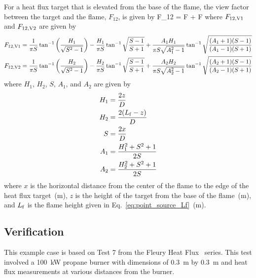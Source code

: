 \noindent For a heat flux target that is elevated from the base of the flame, the view factor between the target and the flame, $F_{12}$, is given by
\be
F_{12} = F + F
\label{eq:solid_flame_F12_V1V2}
\ee
where $F\sb{12, V1}$ and $F\sb{12, V2}$ are given by
\begin{align}
F\sb{12, V1} &= \frac{1}{\pi S} \tan^{-1} \left( \frac{H_1}{\sqrt{S^2-1}} \right) - \frac{H_1}{\pi S} \tan^{-1} \sqrt{\frac{S-1}{S+1}} +
\frac{A_1 H_1}{\pi S \sqrt{A_1^2-1}} \tan^{-1} \sqrt{\frac{(A_1+1)(S-1)}{(A_1-1)(S+1)}} \\
F\sb{12, V2} &= \frac{1}{\pi S} \tan^{-1} \left( \frac{H_2}{\sqrt{S^2-1}} \right) - \frac{H_2}{\pi S} \tan^{-1} \sqrt{\frac{S-1}{S+1}} +
\frac{A_2 H_2}{\pi S \sqrt{A_2^2-1}} \tan^{-1} \sqrt{\frac{(A_2+1)(S-1)}{(A_2-1)(S+1)}}
\label{eq:solid_flame_F12_V1_V2}
\end{align}
where $H_1$, $H_2$, $S$, $A_1$, and $A_2$ are given by
\begin{align}
H_1 &= \frac{2 z}{D}                \\
H_2 &= \frac{2 (L\sb{f}-z)}{D}      \\
S   &= \frac{2 x}{D}                \\
A_1 &= \frac{H_1^2 + S^2 + 1}{2 S}  \\
A_2 &= \frac{H_2^2 + S^2 + 1}{2 S}
\label{eq:solid_flame_H_S_A}
\end{align}
where $x$ is the horizontal distance from the center of the flame to the edge of the heat
flux target~(\si{m}), $z$ is the height of the target from the base of the flame~(\si{m}),
and $L\sb{f}$ is the flame height given in Eq.~\ref{eq:point_source_Lf}~(\si{m}).


\clearpage


\subsection*{Verification}

This example case is based on Test 7 from the Fleury Heat Flux~\cite{Fleury:Masters} series. This test involved a \SI{100}{kW} propane burner with dimensions of 0.3~m by 0.3~m and heat flux measurements at various distances from the burner.

